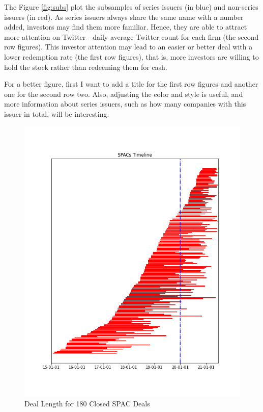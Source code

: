 \documentclass[a4paper,12pt]{article}
\newenvironment{problem}[2][Problem]{\begin{trivlist}
\item[\hskip \labelsep {\bfseries #1}\hskip \labelsep {\bfseries #2.}]}{\end{trivlist}}
\begin{document}
\begin{problem}{3. SPACs Deal Timelines}
	The Figure \ref{fig:subs} plot the subsamples of series issuers (in blue) and non-series issuers (in red). As series issuers always share the same name with a number added, investors may find them more familiar. Hence, they are able to attract more attention on Twitter - daily average Twitter count for each firm (the second row figures). This investor attention may lead to an easier or better deal with a lower redemption rate (the first row figures), that is, more investors are willing to hold the stock rather than redeeming them for cash.\par
	For a better figure, first I want to add a title for the first row figures and another one for the second row two. Also, adjusting the color and style is useful, and more information about series issuers, such as how many companies with this issuer in total, will be interesting.
\end{problem}


\begin{figure}[h]
	\centering
	\caption{Deal Length for 180 Closed SPAC Deals}
	\label{fig:SPACtl}
	\includegraphics[scale=0.9]{SPACs_tl.png}
\end{figure}
\end{document}
